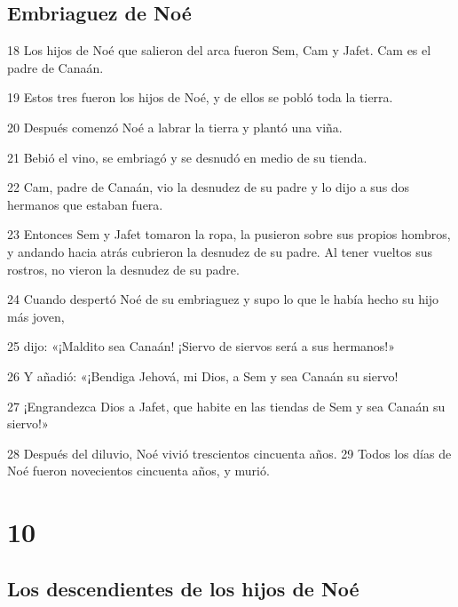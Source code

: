 \section*{Embriaguez de Noé}

\par 18 Los hijos de Noé que salieron del arca fueron Sem, Cam y Jafet. Cam es el padre de Canaán. 
\par 19 Estos tres fueron los hijos de Noé, y de ellos se pobló toda la tierra.
\par 20 Después comenzó Noé a labrar la tierra y plantó una viña.
\par 21 Bebió el vino, se embriagó y se desnudó en medio de su tienda.
\par 22 Cam, padre de Canaán, vio la desnudez de su padre y lo dijo a sus dos hermanos que estaban fuera.
\par 23 Entonces Sem y Jafet tomaron la ropa, la pusieron sobre sus propios hombros, y andando hacia atrás cubrieron la desnudez de su padre. Al tener vueltos sus rostros, no vieron la desnudez de su padre.
\par 24 Cuando despertó Noé de su embriaguez y supo lo que le había hecho su hijo más joven,
\par 25 dijo: «¡Maldito sea Canaán! ¡Siervo de siervos será a sus hermanos!»
\par 26 Y añadió: «¡Bendiga Jehová, mi Dios, a Sem y sea Canaán su siervo!
\par 27 ¡Engrandezca Dios a Jafet, que habite en las tiendas de Sem y sea Canaán su siervo!»
\par 28 Después del diluvio, Noé vivió trescientos cincuenta años. 29 Todos los días de Noé fueron novecientos cincuenta años, y murió.

\chapter{10}

\section*{Los descendientes de los hijos de Noé}

